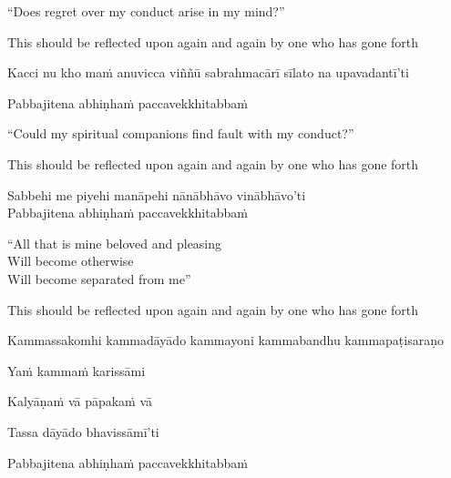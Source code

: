 \begin{english-verses}
  ``Does regret over my conduct arise in my mind?''
  \begin{english-hangtogether-verses}
    This should be reflected upon again and again by one who has gone forth
  \end{english-hangtogether-verses}
\end{english-verses}

\begin{pali-hang}
  Kacci nu kho maṁ anuvicca viññū sabrahmacārī sīlato na upavadantī'ti
\end{pali-hang}
\begin{pali-hangtogether}
Pabbajitena abhiṇhaṁ paccavekkhitabbaṁ
\end{pali-hangtogether}

\begin{english-verses}
  ``Could my spiritual companions find fault with my conduct?''
  \begin{english-hangtogether-verses}
    This should be reflected upon again and again by one who has gone forth
  \end{english-hangtogether-verses}
\end{english-verses}

Sabbehi me piyehi manāpehi nānābhāvo vinābhāvo'ti\\
Pabbajitena abhiṇhaṁ paccavekkhitabbaṁ

\begin{english-verses}
  ``All that is mine beloved and pleasing\\
  Will become otherwise\\
  Will become separated from me''
  \begin{english-hangtogether-verses}
    This should be reflected upon again and again by one who has gone forth
  \end{english-hangtogether-verses}
\end{english-verses}

\begin{pali-hang}
  Kammassakomhi kammadāyādo kammayoni kammabandhu kammapaṭisaraṇo
\end{pali-hang}
\begin{pali-hangtogether}
Yaṁ kammaṁ karissāmi
\end{pali-hangtogether}
\begin{pali-hangtogether}
Kalyāṇaṁ vā pāpakaṁ vā
\end{pali-hangtogether}
\begin{pali-hangtogether}
Tassa dāyādo bhavissāmī'ti
\end{pali-hangtogether}
\begin{pali-hangtogether}
Pabbajitena abhiṇhaṁ paccavekkhitabbaṁ
\end{pali-hangtogether}


